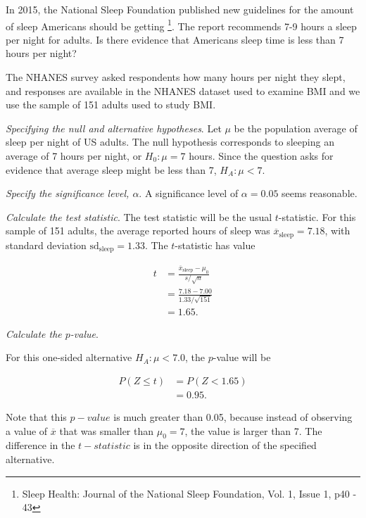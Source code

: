 \begin{spacing}{1.5}
\begin{example}
\end{example}

\begin{example}
	
In 2015, the National Sleep Foundation published new guidelines for the amount of sleep Americans should be getting \footnote{Sleep Health: Journal of the National Sleep Foundation, Vol. 1, Issue 1, p40 - 43}. The report recommends 7-9 hours a sleep per night for adults.  Is there evidence that Americans sleep time is less than 7 hours per night?

The NHANES survey asked respondents how many hours per night they slept, and responses are available in the NHANES dataset used to examine BMI and we use the sample of 151 adults used to study BMI.

\textit{Specifying the  null and alternative hypotheses}.  Let $\mu$ be the population average of sleep per night of US adults.  The null hypothesis corresponds to sleeping an average of 7 hours per night, or $H_0: \mu = 7$ hours. Since the question asks for evidence that average sleep might be less than 7, $H_A: \mu < 7$.

\textit{Specify the significance level, $\alpha$}.  A significance level of $\alpha = 0.05$ seems reasonable. 


\textit{Calculate the test statistic}.  The test statistic will be the usual $t$-statistic. For this sample of 151 adults, the average reported hours of sleep was $\overline{x}_{\text{sleep}} =7.18$, with standard deviation $\text{sd}_{\text{sleep}}= 1.33$.  The $t$-statistic has value


\begin{align*}
t &= \frac{\overline{x}_{\text{sleep}}-\mu_0}{s/\sqrt{n}} \\
  &= \frac{7.18 - 7.00} {1.33/\sqrt{151}} \\
  &= 1.65.
\end{align*}

\textit{Calculate the $p$-value}.

For this one-sided alternative $H_A: \mu < 7.0$, the $p$-value will be 

\begin{align*}
	P(Z \leq t) &= P(Z < 1.65) \\
	&= 0.95.
\end{align*}

Note that this $p-value$ is much greater than 0.05, because instead of observing a value of $\overline{x}$ that was smaller than $\mu_0 = 7$, the value is larger than  7.  The difference in the $t-statistic$ is in the opposite direction of the specified alternative.


\end{example}
\end{spacing}
